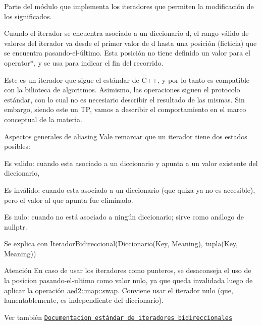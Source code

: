 Parte del módulo que implementa los iteradores que permiten la modificación de los significados. 

Cuando el iterador se encuentra asociado a un diccionario {\ttfamily d}, el rango válido de valores del iterador va desde el primer valor de {\ttfamily d} hasta una posición (ficticia) que se encuentra pasando-\/el-\/último. Esta posición no tiene definido un valor para el {\ttfamily operator$\ast$}, y se usa para indicar el fin del recorrido.

Este es un iterador que sigue el estándar de C++, y por lo tanto es compatible con la bilioteca de algoritmos. Asimismo, las operaciones siguen el protocolo estándar, con lo cual no es necesiario describir el resultado de las mismas. Sin embargo, siendo este un TP, vamos a describir el comportamiento en el marco conceptual de la materia.

\begin{DoxyParagraph}{Aspectos generales de aliasing}
Vale remarcar que un iterador tiene dos estados posibles\+:
\begin{DoxyEnumerate}
\item Es valido\+: cuando esta asociado a un diccionario y apunta a un valor existente del diccionario,
\item Es inválido\+: cuando esta asociado a un diccionario (que quiza ya no es accesible), pero el valor al que apunta fue eliminado.
\item Es nulo\+: cuando no está asociado a ningún diccionario; sirve como análogo de {\ttfamily nullptr}. 
\end{DoxyEnumerate}
\end{DoxyParagraph}


\begin{DoxyParagraph}{Se explica con}
Iterador\+Bidireccional(Diccionario(Key, Meaning), tupla(Key, Meaning))
\end{DoxyParagraph}
\begin{DoxyAttention}{Atención}
En caso de usar los iteradores como punteros, se desaconseja el uso de la posicion pasando-\/el-\/ultimo como valor nulo, ya que queda invalidada luego de aplicar la operación \hyperlink{classaed2_1_1map_a43ddb71cc91e5c6021a7a1f243d6cc4a_a43ddb71cc91e5c6021a7a1f243d6cc4a}{aed2\+::map\+::swap}. Conviene usar el iterador nulo (que, lamentablemente, es independiente del diccionario).
\end{DoxyAttention}
\begin{DoxySeeAlso}{Ver también}
\href{http://en.cppreference.com/w/cpp/concept/BidirectionalIterator}{\tt Documentacion estándar de iteradores bidireccionales} 
\end{DoxySeeAlso}


